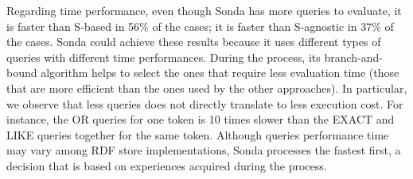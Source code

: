 Regarding time performance, even though Sonda has more queries to evaluate, it is faster than S-based in 56\% of the cases; it is faster than S-agnostic in 37\% of the cases. Sonda could achieve these results because it uses different types of queries with different time performances. During the process, its branch-and-bound algorithm helps to select the ones that require less evaluation time (those that are more efficient than the ones used by the other approaches). In particular, we observe that less queries does not directly translate to less execution cost. For instance, the OR queries for one token is 10 times slower than the EXACT and LIKE queries together for the same token. Although queries performance time may vary among RDF store implementations, Sonda processes the fastest first, a decision that is based on experiences acquired during the process. 



 

 